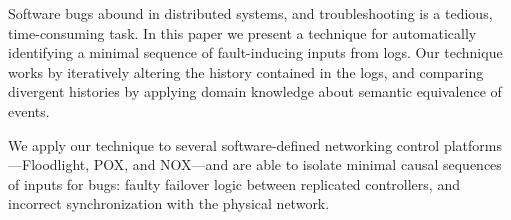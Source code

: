 Software bugs abound in distributed systems, and troubleshooting
is a tedious, time-consuming task.
In this paper we present a technique for automatically identifying
a minimal sequence of fault-inducing inputs from logs. Our technique works by
iteratively altering the history contained in the logs, and comparing divergent histories
by applying domain knowledge about semantic equivalence of events.

We apply our technique to several software-defined networking control
platforms---Floodlight, POX, and NOX---and
are able to isolate minimal causal sequences of inputs for
 bugs: faulty failover logic between replicated controllers, and incorrect
synchronization with the physical network.
